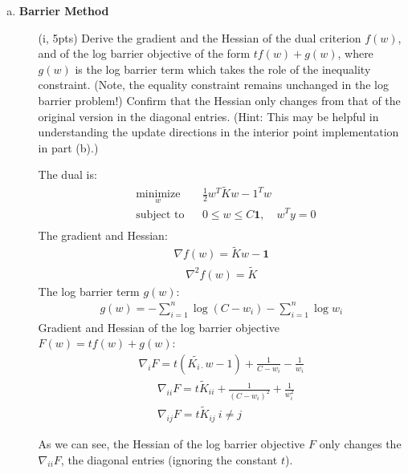 \documentclass{article}
\theoremstyle{remark}
\theoremstyle{definition}
\begin{document}
\begin{enumerate}[(a)]

\item \textbf{Barrier Method} 
  \begin{enumerate}[(i)]

  \item[(i, 5pts)] Derive the gradient and the Hessian of the dual criterion $f(w)$, and of
    the log barrier objective of the form $tf(w) + g(w)$, where $g(w)$ is the
    log barrier term which takes the role of the inequality constraint. (Note,
    the equality constraint remains unchanged in the log barrier problem!)
    Confirm that the Hessian only changes from that of the original version in
    the diagonal entries. (Hint: This may be helpful in understanding the update
    directions in the interior point implementation in part (b).)
    
    {
    \color{blue}
    The dual is:
    \begin{equation*}
    \begin{aligned} 
      & \underset{w}{\text{minimize}} && \frac{1}{2}w^T \tilde{K} w -1^Tw \\
      & \text{subject to} && 0\leq w\leq C\mathbf{1}, \quad w^Ty = 0\\
    \end{aligned}
    \end{equation*}
    The gradient and Hessian:
    \begin{align*}
        \nabla f(w) = \tilde{K} w-\mathbf{1}
    \end{align*}
    \begin{align*}
        \nabla^2 f(w) = \tilde{K}
    \end{align*}
    The log barrier term $g(w)$:
    \begin{align*}
        g(w) = -\sum_{i=1}^n \log (C-w_i)-\sum_{i=1}^n\log w_i
    \end{align*}
    Gradient and Hessian of the log barrier objective $F(w)=tf(w)+g(w)$:
    \begin{align*}
        \nabla_i F= t(\tilde{K_{i\cdot}}w-1)+\frac{1}{C-w_i}-\frac{1}{w_i}
    \end{align*}
    \begin{align*}
        &\nabla_{ii} F=t\tilde{K}_{ii}+\frac{1}{(C-w_i)^2}+\frac{1}{w_i^2} \\
        &\nabla_{ij} F=t\tilde{K}_{ij} ~ i\neq j
    \end{align*}
    
    As we can see, the Hessian of the log barrier objective $F$ only changes the $\nabla_{ii}F$, the diagonal entries (ignoring the constant $t$).
    }
    

\end{enumerate}
\end{enumerate}
\end{document}
